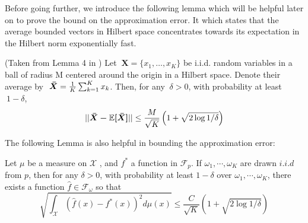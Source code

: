 \documentclass{article}
\begin{document}
Before going further, we introduce the following lemma which will be helpful later on to prove the bound on the approximation error. It which states that the average bounded vectors in Hilbert space concentrates towards its expectation in the Hilbert norm exponentially fast.

\begin{lemma}
    (Taken from Lemma 4 in \citep{NIPS2008_3495}) Let $\ \mathbf{X} = \{x_1, \dots, x_K\}$ be i.i.d. random variables in a ball  of radius M centered around the origin in a Hilbert space. Denote their average by $\ \bm{\Bar{X}} = \frac{1}{K}\sum_{k=1}^{K} x_k$. Then, for any $\ \delta > 0$, with probability at least $\ 1-\delta$,
    \begin{align*}
        ||\bm{\Bar{X} - \mathbb{E}[\bm{\Bar{X}}]}|| \leq \frac{M}{\sqrt{K}}\left(1 + \sqrt{2\log 1/\delta}\right)
    \end{align*}
    \label{lma:concentration_bound_1}
\end{lemma}

The following Lemma is also helpful in bounding the approximation error:
\begin{lemma}
     Let $\mu$ be a measure on $\mathcal{X}$ , and $f^{*}$
    a function in $\mathcal{F}_p$. If $\omega_1,\cdots, \omega_K$ are drawn $i.i.d$ from $p$,
    then for any $\delta > 0$, with probability at least $1 - \delta$ over $\omega_1,\cdots , \omega_K$,
    there exists a function $\hat{f} \in \mathcal{\mathcal{F}}_\omega$
    so that
    \[
    \sqrt{\int_\mathcal{X} \left(\hat{f}(x)- f^{*}(x) \right)^2d\mu(x)} \leq \frac{C}{\sqrt{K}} \left( 1+ \sqrt{2 \log 1/\delta}\right)
    \]
    \label{lma:concentration_bound_2}
\end{lemma}
\end{document}
